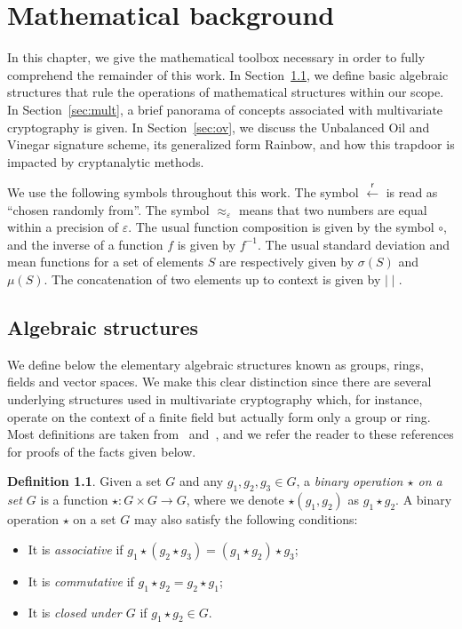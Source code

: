 \documentclass[draft, 12pt, a4paper, oneside]{memoir}
\newcommand{\random}{\overset{\mathsf{r}}{\gets}}
\theoremstyle{definition}
\newtheorem{definition}[theorem]{Definition}
\begin{document}

\chapter{Mathematical background}\label{chapter:math}

In this chapter, we give the mathematical toolbox necessary in order to fully comprehend the remainder of this work. In Section~\ref{sec:algebra}, we define basic algebraic structures that rule the operations of mathematical structures within our scope. In Section~\ref{sec:mult}, a brief panorama of concepts associated with multivariate cryptography is given. In Section~\ref{sec:ov}, we discuss the Unbalanced Oil and Vinegar signature scheme, its generalized form Rainbow, and how this trapdoor is impacted by cryptanalytic methods.

We use the following symbols throughout this work. The symbol $\random$ is read as ``chosen randomly from''. The symbol $\approx_{\varepsilon}$ means that two numbers are equal within a precision of $\varepsilon$. The usual function composition is given by the symbol $\circ$, and the inverse of a function $f$ is given by $f^{-1}$. The usual standard deviation and mean functions for a set of elements $S$ are respectively given by $\sigma(S)$ and $\mu(S)$. The concatenation of two elements up to context is given by $\mid\mid$.

\section{Algebraic structures}\label{sec:algebra}

We define below the elementary algebraic structures known as groups, rings, fields and vector spaces. We make this clear distinction since there are several underlying structures used in multivariate cryptography which, for instance, operate on the context of a finite field but actually form only a group or ring. Most definitions are taken from~\cite{Dummit:2003} and~\cite{Mullen:2013}, and we refer the reader to these references for proofs of the facts given below.

\begin{definition}
  Given a set $G$ and any $g_{1}, g_{2}, g_{3} \in G$, a \emph{binary operation $\star$ on a set $G$} is a function $\star : G \times G \to G$, where we denote $\star(g_{1}, g_{2})$ as $g_{1} \star g_{2}$. A binary operation $\star$ on a set $G$ may also satisfy the following conditions:
  
  \begin{itemize}
    \item It is \emph{associative} if $g_{1} \star (g_{2} \star g_{3}) = (g_{1} \star g_{2}) \star g_{3}$;
    \item It is \emph{commutative} if $g_{1} \star g_{2} = g_{2} \star g_{1}$;
    \item It is \emph{closed under $G$} if $g_{1} \star g_{2} \in G$.
  \end{itemize}
\end{definition}
\end{document}
